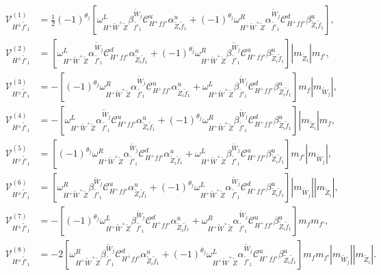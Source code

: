 \documentclass[final,3p,times]{elsarticle}
\begin{document}
\begin{align}
\mathcal{V}_{H^{\pm} \tilde{f'}_1}^{(1)} &= \frac{1}{2}(-1)^{\theta_j}[\omega_{H^+ \tilde{W}^+ \tilde{Z}}^L \beta_{\tilde{f'}_1}^{\tilde{W}_j} \mathcal{C}_{H^+ f f'}^u \alpha_{\tilde{Z}_i \tilde{f}_1}^{u} + (-1)^{\theta_j}\omega_{H^+ \tilde{W}^+ \tilde{Z}}^R \alpha_{\tilde{f'}_1}^{\tilde{W}_j} \mathcal{C}_{H^+ f f'}^d \beta_{\tilde{Z}_i \tilde{f}_1}^{u}], \\
\mathcal{V}_{H^{\pm} \tilde{f'}_1}^{(2)} &= [\omega_{H^+ \tilde{W}^+ \tilde{Z}}^L \alpha_{\tilde{f'}_1}^{\tilde{W}_j} \mathcal{C}_{H^+ f f'}^d \alpha_{\tilde{Z}_i \tilde{f}_1}^{u} + (-1)^{\theta_j} \omega_{H^+ \tilde{W}^+ \tilde{Z}}^R \beta_{\tilde{f'}_1}^{\tilde{W}_j} \mathcal{C}_{H^+ f f'}^u \beta_{\tilde{Z}_i \tilde{f}_1}^{u}]|m_{\tilde{Z}_i}|m_{f'}, \\
\mathcal{V}_{H^{\pm} \tilde{f'}_1}^{(3)} &= -[(-1)^{\theta_j}\omega_{H^+ \tilde{W}^+ \tilde{Z}}^R \alpha_{\tilde{f'}_1}^{\tilde{W}_j} \mathcal{C}_{H^+ f f'}^u \alpha_{\tilde{Z}_i \tilde{f}_1}^{u} + \omega_{H^+ \tilde{W}^+ \tilde{Z}}^L \beta_{\tilde{f'}_1}^{\tilde{W}_j} \mathcal{C}_{H^+ f f'}^d \beta_{\tilde{Z}_i \tilde{f}_1}^{u} ]m_{f}|m_{\tilde{W}_j}|, \\
\mathcal{V}_{H^{\pm} \tilde{f'}_1}^{(4)} &= -[\omega_{H^+ \tilde{W}^+ \tilde{Z}}^L \alpha_{\tilde{f'}_1}^{\tilde{W}_j} \mathcal{C}_{H^+ f f'}^u \alpha_{\tilde{Z}_i \tilde{f}_1}^{u} + (-1)^{\theta_j}\omega_{H^+ \tilde{W}^+ \tilde{Z}}^R \beta_{\tilde{f'}_1}^{\tilde{W}_j} \mathcal{C}_{H^+ f f'}^d \beta_{\tilde{Z}_i \tilde{f}_1}^{u}]|m_{\tilde{Z}_i}|m_{f}, \\
\mathcal{V}_{H^{\pm} \tilde{f'}_1}^{(5)} &= [(-1)^{\theta_j}\omega_{H^+ \tilde{W}^+ \tilde{Z}}^R \alpha_{\tilde{f'}_1}^{\tilde{W}_j} \mathcal{C}_{H^+ f f'}^d \alpha_{\tilde{Z}_i \tilde{f}_1}^{u} + \omega_{H^+ \tilde{W}^+ \tilde{Z}}^L \beta_{\tilde{f'}_1}^{\tilde{W}_j} \mathcal{C}_{H^+ f f'}^u \beta_{\tilde{Z}_i \tilde{f}_1}^{u}]m_{f'}|m_{\tilde{W}_j}|, \\
\mathcal{V}_{H^{\pm} \tilde{f'}_1}^{(6)} &= [\omega_{H^+ \tilde{W}^+ \tilde{Z}}^R \beta_{\tilde{f'}_1}^{\tilde{W}_j} \mathcal{C}_{H^+ f f'}^u \alpha_{\tilde{Z}_i \tilde{f}_1}^{u} + (-1)^{\theta_j}\omega_{H^+ \tilde{W}^+ \tilde{Z}}^L \alpha_{\tilde{f'}_1}^{\tilde{W}_j} \mathcal{C}_{H^+ f f'}^d \beta_{\tilde{Z}_i \tilde{f}_1}^{u}]|m_{\tilde{W}_j}||m_{\tilde{Z}_i}|, \\
\mathcal{V}_{H^{\pm} \tilde{f'}_1}^{(7)} &= -[(-1)^{\theta_j}\omega_{H^+ \tilde{W}^+ \tilde{Z}}^L \beta_{\tilde{f'}_1}^{\tilde{W}_j}  \mathcal{C}_{H^+ f f'}^d \alpha_{\tilde{Z}_i \tilde{f}_1}^{u} +  \omega_{H^+ \tilde{W}^+ \tilde{Z}}^R  \alpha_{\tilde{f'}_1}^{\tilde{W}_j} \mathcal{C}_{H^+ f f'}^u \beta_{\tilde{Z}_i \tilde{f}_1}^{u}]m_{f}m_{f'}, \\
\mathcal{V}_{H^{\pm} \tilde{f'}_1}^{(8)} &= -2[\omega_{H^+ \tilde{W}^+ \tilde{Z}}^R \beta_{\tilde{f'}_1}^{\tilde{W}_j} \mathcal{C}_{H^+ f f'}^d \alpha_{\tilde{Z}_i \tilde{f}_1}^{u} + (-1)^{\theta_j}\omega_{H^+ \tilde{W}^+ \tilde{Z}}^L \alpha_{\tilde{f'}_1}^{\tilde{W}_j} \mathcal{C}_{H^+ f f'}^u  \beta_{\tilde{Z}_i \tilde{f}_1}^{u}]m_{f}m_{f'}|m_{\tilde{W}_j}||m_{\tilde{Z}_i}|.
\end{align}
\end{document}
